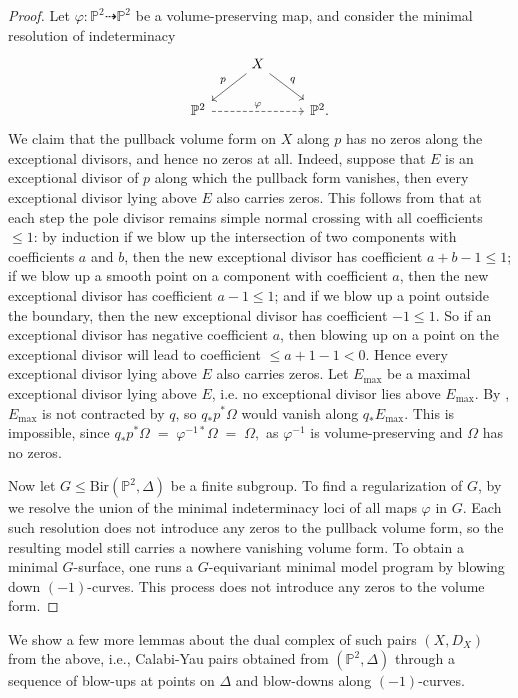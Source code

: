 \documentclass[a4paper,12pt,oneside]{amsart}
\numberwithin{equation}{section}
\theoremstyle{definition}
\theoremstyle{remark}
\newcommand{\PP}{\mathbb{P}}
\newcommand{\Ptwo}{\mathbb{P}^2}
\begin{document}
\begin{proof}
Let $\varphi: \mathbb{P}^2 \dashrightarrow \mathbb{P}^2$ be a volume-preserving map, and consider the minimal resolution of indeterminacy
\[
\begin{tikzcd}
& X \arrow[ld, "p"'] \arrow[rd, "q"] & \\
\mathbb{P}^2 \arrow[rr, dashed, "\varphi"] & & \mathbb{P}^2 .
\end{tikzcd}
\]
We claim that the pullback volume form on $X$ along $p$ has no zeros along the exceptional divisors, and hence no zeros at all. Indeed, suppose that $E$ is an exceptional divisor of $p$ along which the pullback form vanishes, then every exceptional divisor lying above $E$ also carries zeros. This follows from that at each step the pole divisor remains simple normal crossing with all coefficients $\leq 1$: by induction if we blow up the intersection of two components with coefficients $a$ and $b$, then the new exceptional divisor has coefficient $a+b-1 \leq 1$; if we blow up a smooth point on a component with coefficient $a$, then the new exceptional divisor has coefficient $a-1 \leq 1$; and if we blow up a point outside the boundary, then the new exceptional divisor has coefficient $-1 \leq 1$. So if an exceptional divisor has negative coefficient $a$, then blowing up on a point on the exceptional divisor will lead to coefficient $\leq a+1-1 < 0$. Hence every exceptional divisor lying above $E$ also carries zeros. Let $E_{\max}$ be a maximal exceptional divisor lying above $E$, i.e. no exceptional divisor lies above \(E_{\max}\). By \cite[Lemma 2.11(2)]{deFernexEin2002}, $E_{\max}$ is not contracted by $q$, so $q_* p^* \Omega$ would vanish along $q_* E_{\max}$. This is impossible, since
\(
q_* p^* \Omega \;=\; \varphi^{-1*}\Omega \;=\; \Omega,
\)
as $\varphi^{-1}$ is volume-preserving and $\Omega$ has no zeros.

Now let $G \leqslant \mathrm{Bir}(\PP^2, \Delta)$ be a finite subgroup. To find a regularization of $G$, by \cite{deFernexEin2002} we resolve the union of the minimal indeterminacy loci of all maps $\varphi$ in $G$. Each such resolution does not introduce any zeros to the pullback volume form, so the resulting model still carries a nowhere vanishing volume form.
To obtain a minimal $G$-surface, one runs a $G$-equivariant minimal model program by blowing down $(-1)$-curves. This process does not introduce any zeros to the volume form.
\end{proof}

We show a few more lemmas about the dual complex of such pairs $(X, D_X)$ from the above, i.e., Calabi-Yau pairs obtained from $(\Ptwo,\Delta)$ through a sequence of blow-ups at points on $\Delta$ and blow-downs along $(-1)$-curves.
\end{document}
